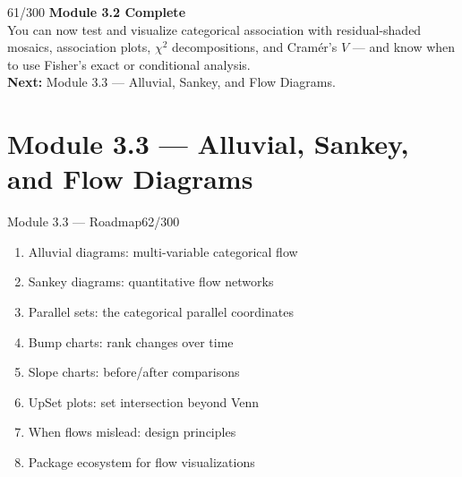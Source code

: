 \documentclass[10pt]{beamer}
\newcommand{\smark}[1]{\hfill{\scriptsize\color{codegray}#1}}
\begin{document}
\begin{frame}{}\smark{61/300}
\centering\vspace{1.5cm}
{\Large\textbf{Module 3.2 Complete}}\\[0.5cm]
You can now test and visualize categorical association with residual-shaded mosaics, association plots, $\chi^2$ decompositions, and Cramér's $V$ --- and know when to use Fisher's exact or conditional analysis.\\[0.5cm]
\textbf{Next:} Module 3.3 --- Alluvial, Sankey, and Flow Diagrams.
\end{frame}

\section{Module 3.3 --- Alluvial, Sankey, and Flow Diagrams}

\begin{frame}{Module 3.3 --- Roadmap}\smark{62/300}
\begin{enumerate}
    \item Alluvial diagrams: multi-variable categorical flow
    \item Sankey diagrams: quantitative flow networks
    \item Parallel sets: the categorical parallel coordinates
    \item Bump charts: rank changes over time
    \item Slope charts: before/after comparisons
    \item UpSet plots: set intersection beyond Venn
    \item When flows mislead: design principles
    \item Package ecosystem for flow visualizations
\end{enumerate}
\end{frame}
\end{document}
